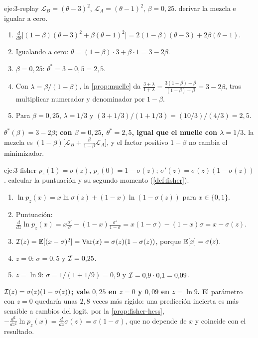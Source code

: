 \begin{solucion}{eje:3-replay}
\datos $\mathcal{L}_B=(\theta-3)^{2}$, $\mathcal{L}_A=(\theta-1)^{2}$, $\beta=0{,}25$.
\planteamiento derivar la mezcla e igualar a cero.
\pasos
\begin{enumerate}[label=\arabic*.]
  \item $\frac{d}{d\theta}\bigl[(1-\beta)(\theta-3)^{2}+\beta(\theta-1)^{2}\bigr]=2(1-\beta)(\theta-3)+2\beta(\theta-1)$.
  \item Igualando a cero: $\theta=(1-\beta)\cdot 3+\beta\cdot 1=3-2\beta$.
  \item $\beta=0{,}25$: $\theta^{\ast}=3-0{,}5=2{,}5$.
  \item Con $\lambda=\beta/(1-\beta)$, la \cref{prop:muelle} da $\frac{3+\lambda}{1+\lambda}=\frac{3(1-\beta)+\beta}{(1-\beta)+\beta}=3-2\beta$, tras multiplicar numerador y denominador por $1-\beta$.
  \item Para $\beta=0{,}25$, $\lambda=1/3$ y $(3+1/3)/(1+1/3)=(10/3)/(4/3)=2{,}5$.
\end{enumerate}
\resultado \textbf{$\theta^{\ast}(\beta)=3-2\beta$; con $\beta=0{,}25$, $\theta^{\ast}=2{,}5$, igual que el muelle con $\lambda=1/3$.}
\comprobacion la mezcla es $(1-\beta)\bigl[\mathcal{L}_B+\tfrac{\beta}{1-\beta}\mathcal{L}_A\bigr]$, y el factor positivo $1-\beta$ no cambia el minimizador.
\end{solucion}

\begin{solucion}{eje:3-fisher}
\datos $p_z(1)=\sigma(z)$, $p_z(0)=1-\sigma(z)$; $\sigma'(z)=\sigma(z)(1-\sigma(z))$.
\planteamiento calcular la puntuación y su segundo momento (\cref{def:fisher}).
\pasos
\begin{enumerate}[label=\arabic*.]
  \item $\ln p_z(x)=x\ln\sigma(z)+(1-x)\ln(1-\sigma(z))$ para $x\in\{0,1\}$.
  \item Puntuación: $\frac{d}{dz}\ln p_z(x)=x\frac{\sigma'}{\sigma}-(1-x)\frac{\sigma'}{1-\sigma}=x(1-\sigma)-(1-x)\sigma=x-\sigma(z)$.
  \item $\mathcal{I}(z)=\mathbb{E}[(x-\sigma)^{2}]=\operatorname{Var}(x)=\sigma(z)(1-\sigma(z))$, porque $\mathbb{E}[x]=\sigma(z)$.
  \item $z=0$: $\sigma=0{,}5$ y $\mathcal{I}=0{,}25$.
  \item $z=\ln 9$: $\sigma=1/(1+1/9)=0{,}9$ y $\mathcal{I}=0{,}9\cdot 0{,}1=0{,}09$.
\end{enumerate}
\resultado \textbf{$\mathcal{I}(z)=\sigma(z)(1-\sigma(z))$; vale $0{,}25$ en $z=0$ y $0{,}09$ en $z=\ln 9$.} El parámetro con $z=0$ quedaría unas $2{,}8$ veces más rígido: una predicción incierta es más sensible a cambios del logit.
\comprobacion por la \cref{prop:fisher-hess}, $-\frac{d^{2}}{dz^{2}}\ln p_z(x)=\frac{d}{dz}\sigma(z)=\sigma(1-\sigma)$, que no depende de $x$ y coincide con el resultado.
\end{solucion}

